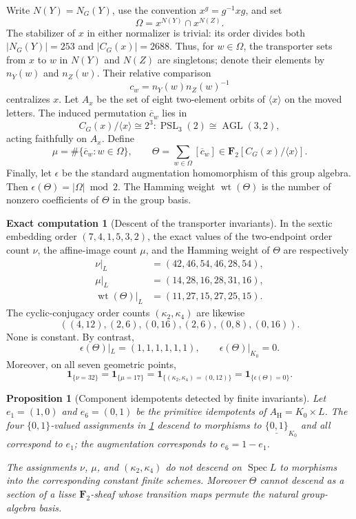 \documentclass[11pt]{amsart}
\newtheorem{proposition}[proposition]{Proposition}
\theoremstyle{definition}
\newtheorem{computation}[computation]{Exact computation}
\theoremstyle{remark}
\newcommand{\FF}{\mathbf F}
\newcommand{\PSL}{\operatorname{PSL}}
\begin{document}
\smallskip
Write $N(Y)=N_G(Y)$, use the convention $x^g=g^{-1}xg$, and set
\[
 \Omega=x^{N(Y)}\cap x^{N(Z)}.
\]
The stabilizer of $x$ in either normalizer is trivial: its order divides
both $|N_G(Y)|=253$ and $|C_G(x)|=2688$.  Thus, for $w\in\Omega$, the
transporter sets from $x$ to $w$ in $N(Y)$ and $N(Z)$ are singletons; denote
their elements by $n_Y(w)$ and $n_Z(w)$.  Their relative comparison
\[
 c_w=n_Y(w)n_Z(w)^{-1}
\]
centralizes $x$.  Let $A_x$ be the set of eight two-element orbits of
$\langle x\rangle$ on the moved letters.  The induced permutation
$\overline c_w$ lies in
\[
 C_G(x)/\langle x\rangle\cong 2^3{:}\PSL_3(2)
       \cong\operatorname{AGL}(3,2),
\]
acting faithfully on $A_x$.  Define
\[
 \mu=\#\{\overline c_w:w\in\Omega\},\qquad
 \Theta=\sum_{w\in\Omega}[\overline c_w]
       \in\FF_2[C_G(x)/\langle x\rangle].
\]
Finally, let $\epsilon$ be the standard augmentation homomorphism of this
group algebra.  Then $\epsilon(\Theta)=|\Omega|\bmod2$.  The Hamming weight
$\operatorname{wt}(\Theta)$ is the number of nonzero coefficients of
$\Theta$ in the group basis.

\smallskip
\begin{computation}[Descent of the transporter invariants]
\label{comp:relative-transporter-descent}
In the sextic embedding order $(7,4,1,5,3,2)$, the exact values of the
two-endpoint order count $\nu$, the affine-image count $\mu$, and the Hamming
weight of $\Theta$ are respectively
\[
\begin{split}
 \nu|_L&=(42,46,54,46,28,54),\\
 \mu|_L&=(14,28,16,28,31,16),\\
 \operatorname{wt}(\Theta)|_L&=(11,27,15,27,25,15).
\end{split}
\]
The cyclic-conjugacy order counts $(\kappa_2,\kappa_4)$ are likewise
\[
 ((4,12),(2,6),(0,16),(2,6),(0,8),(0,16)).
\]
None is constant.  By contrast,
\[
 \epsilon(\Theta)|_L=(1,1,1,1,1,1),
 \qquad \epsilon(\Theta)|_{K_0}=0.
\]
Moreover, on all seven geometric points,
\[
 \boldsymbol1_{\{\nu=32\}}
 =\boldsymbol1_{\{\mu=17\}}
 =\boldsymbol1_{\{(\kappa_2,\kappa_4)=(0,12)\}}
 =\boldsymbol1_{\{\epsilon(\Theta)=0\}}.
\]
\end{computation}

\smallskip
\begin{proposition}[Component idempotents detected by finite invariants]
\label{prop:relative-transporter-descent}
Let $e_1=(1,0)$ and $e_6=(0,1)$ be the primitive idempotents of
$A_{\mathrm H}=K_0\times L$.  The four $\{0,1\}$-valued assignments in
\cref{comp:relative-transporter-descent} descend to morphisms to
$\underline{\{0,1\}}_{K_0}$ and all correspond to
$e_1$; the augmentation corresponds to $e_6=1-e_1$.

The assignments $\nu$, $\mu$, and $(\kappa_2,\kappa_4)$ do not descend on
$\operatorname{Spec}L$ to morphisms into the corresponding constant finite
schemes.  Moreover $\Theta$ cannot descend as a section of a lisse
$\FF_2$-sheaf whose transition maps permute the natural group-algebra basis.
\end{proposition}
\end{document}
